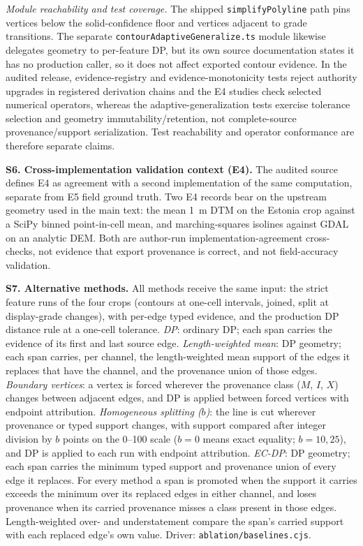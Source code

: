 \documentclass[11pt]{article}
\begin{document}
\vspace{3mm}
\noindent\emph{Module reachability and test coverage.} The shipped \texttt{simplifyPolyline} path pins vertices below the
solid-confidence floor and vertices adjacent to grade transitions. The separate \texttt{contourAdaptiveGeneralize.ts}
module likewise delegates geometry to per-feature DP, but its own source documentation states it has no production
caller, so it does not affect exported contour evidence. In the audited release,
evidence-registry and evidence-monotonicity tests reject authority upgrades in registered derivation chains and the E4
studies check selected numerical operators, whereas the adaptive-generalization tests exercise tolerance selection and
geometry immutability/retention, not complete-source provenance/support serialization. Test reachability and operator
conformance are therefore separate claims.


\vspace{4mm}
\noindent\textbf{S6. Cross-implementation validation context (E4).} The audited source defines E4 as agreement with a second implementation of the same computation, separate from E5 field ground truth. Two E4 records bear on the upstream geometry used in the main text: the mean 1~m DTM on the Estonia crop against a SciPy binned point-in-cell mean, and marching-squares isolines against GDAL on an analytic DEM. Both are author-run implementation-agreement cross-checks, not evidence that export provenance is correct, and not field-accuracy validation.

\vspace{4mm}
\noindent\textbf{S7. Alternative methods.} All methods receive the same input: the strict feature runs of the four crops (contours at one-cell intervals, joined, split at display-grade changes), with per-edge typed evidence, and the production DP distance rule at a one-cell tolerance. \emph{DP}: ordinary DP; each span carries the evidence of its first and last source edge. \emph{Length-weighted mean}: DP geometry; each span carries, per channel, the length-weighted mean support of the edges it replaces that have the channel, and the provenance union of those edges. \emph{Boundary vertices}: a vertex is forced wherever the provenance class ($M$, $I$, $X$) changes between adjacent edges, and DP is applied between forced vertices with endpoint attribution. \emph{Homogeneous splitting ($b$)}: the line is cut wherever provenance or typed support changes, with support compared after integer division by $b$ points on the 0--100 scale ($b=0$ means exact equality; $b=10,25$), and DP is applied to each run with endpoint attribution. \emph{EC-DP}: DP geometry; each span carries the minimum typed support and provenance union of every edge it replaces. For every method a span is promoted when the support it carries exceeds the minimum over its replaced edges in either channel, and loses provenance when its carried provenance misses a class present in those edges. Length-weighted over- and understatement compare the span's carried support with each replaced edge's own value. Driver: \texttt{ablation/baselines.cjs}.
\end{document}
